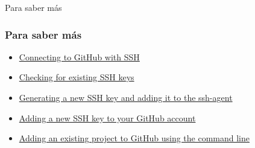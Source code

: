 \documentclass{beamer}
\begin{document}
\begin{frame}[standout]
  Para saber m\'as
\end{frame}

\begin{frame}[fragile]
  \frametitle{Para saber m\'as}
  \begin{itemize}
  \item \href{https://help.github.com/articles/connecting-to-github-with-ssh/}%
    {Connecting to GitHub with SSH}
  \item \href{https://help.github.com/articles/checking-for-existing-ssh-keys/}%
    {Checking for existing SSH keys}
  \item \href{https://help.github.com/articles/generating-a-new-ssh-key-and-adding-it-to-the-ssh-agent/}%
    {Generating a new SSH key and adding it to the ssh-agent}
  \item \href{https://help.github.com/articles/adding-a-new-ssh-key-to-your-github-account/}%
    {Adding a new SSH key to your GitHub account}
  \item \href{https://help.github.com/articles/adding-an-existing-project-to-github-using-the-command-line/}%
    {Adding an existing project to GitHub using the command line}
  \end{itemize}
\end{frame}




\end{document}
